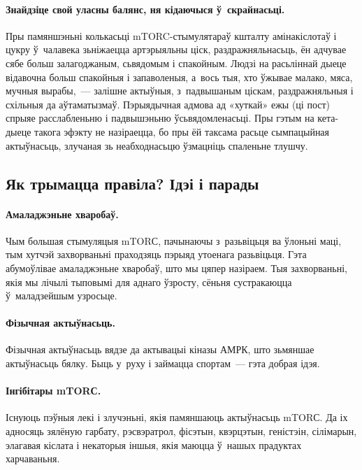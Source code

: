 \paragraph{Знайдзіце свой уласны балянс, ня кідаючыся ў~скрайнасьці.}
Пры памяншэньні колькасьці mTORC-стымулятараў кшталту амінакіслотаў і цукру ў~чалавека зьніжаецца артэрыяльны ціск, раздражняльнасьць, ён адчувае сябе больш залагоджаным, сьвядомым і спакойным. Людзі на расьліннай дыеце відавочна больш спакойныя і запаволеныя, а~вось тыя, хто ўжывае малако, мяса, мучныя вырабы,~--- залішне актыўныя, з~падвышаным ціскам, раздражняльныя і схільныя да аўтаматызмаў. Пэрыядычная адмова ад «хуткай» ежы (ці пост) спрыяе расслабленьню і падвышэньню ўсьвядомленасьці. Пры гэтым на кета-дыеце такога эфэкту не назіраецца, бо пры ёй таксама расьце сымпацыйная актыўнасьць, злучаная зь неабходнасьцю ўзмацніць спаленьне тлушчу.

\subsection{Як трымацца правіла? Ідэі і парады}

\paragraph{Амаладжэньне хваробаў.}
Чым большая стымуляцыя mTORС, пачынаючы з~разьвіцьця ва ўлоньні маці, тым хутчэй захворваньні праходзяць пэрыяд утоенага разьвіцьця. Гэта абумоўлівае амаладжэньне хваробаў, што мы цяпер назіраем. Тыя захворваньні, якія мы лічылі тыповымі для аднаго ўзросту, сёньня сустракаюцца ў~маладзейшым узросьце.

\paragraph{Фізычная актыўнасьць.}
Фізычная актыўнасьць вядзе да актывацыі кіназы АМРК, што зьмяншае актыўнасьць бялку. Быць у~руху і займацца спортам~--- гэта добрая ідэя.

\paragraph{Інгібітары mTORС.}
Існуюць пэўныя лекі і злучэньні, якія памяншаюць актыўнасьць mTORС. Да іх адносяць зялёную гарбату, рэсвэратрол, фісэтын, квэрцэтын, геністэін, сілімарын, элагавая кіслата і некаторыя іншыя, якія маюцца ў~нашых прадуктах харчаваньня.

